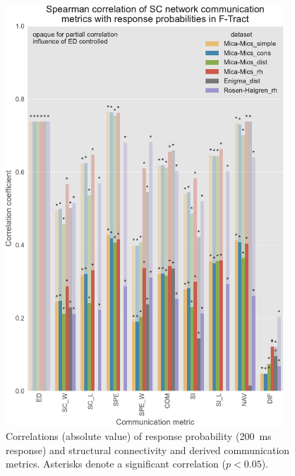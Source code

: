 \begin{figure}
    \centering
    \includegraphics[width=0.93\textwidth]{images/nootebook_generated/ftract_results/MNI-HCP-MMP1/5/ED0/0.25/long/Spearman_correlation_of_SC_network_communication_metrics_with_response_probabilities_in_F-Tract.pdf}
    \caption[F-TRACT probability correlations - all $SC$ matrices]{Correlations (absolute value) of response probability (200~ms response) and structural connectivity and derived communication metrics. Asterisks denote a significant correlation ($p<0.05$).}
    \label{fig:ftract_alldata_long_probabilities}
\end{figure}


